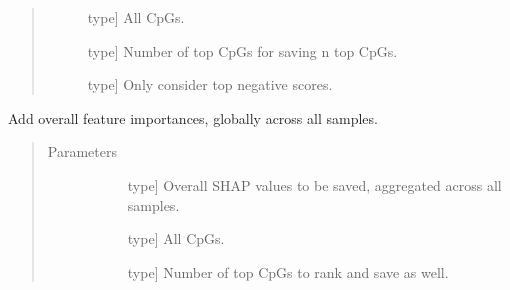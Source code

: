 \documentclass[letterpaper,10pt,english]{sphinxmanual}
\begin{document}
\begin{fulllineitems}
\begin{fulllineitems}
\begin{quote}
\begin{description}
\begin{description}
\item[{}] \leavevmode{[}type{]}
All CpGs.

\item[{}] \leavevmode{[}type{]}
Number of top CpGs for saving n top CpGs.

\item[{}] \leavevmode{[}type{]}
Only consider top negative scores.

\end{description}

\end{description}\end{quote}

\end{fulllineitems}


\begin{fulllineitems}
\label{\detokenize{index:methylnet.interpretation_classes.ShapleyData.add_global_importance}}
Add overall feature importances, globally across all samples.
\begin{quote}\begin{description}
\item[{Parameters}] \leavevmode\begin{description}
\item[{}] \leavevmode{[}type{]}
Overall SHAP values to be saved, aggregated across all samples.

\item[{}] \leavevmode{[}type{]}
All CpGs.

\item[{}] \leavevmode{[}type{]}
Number of top CpGs to rank and save as well.

\end{description}

\end{description}\end{quote}

\end{fulllineitems}


\end{fulllineitems}
\end{document}
